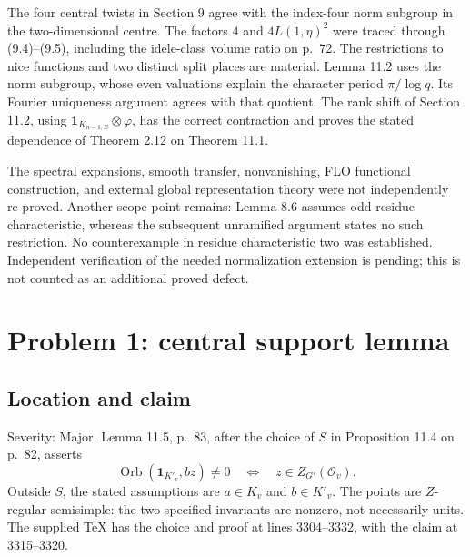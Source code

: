 \documentclass[10pt]{article}
\begin{document}
The four central twists in Section 9 agree with the index-four norm subgroup in the two-dimensional centre. The factors \(4\) and \(4L(1,\eta)^2\) were traced through (9.4)–(9.5), including the idele-class volume ratio on p. 72. The restrictions to nice functions and two distinct split places are material. Lemma 11.2 uses the norm subgroup, whose even valuations explain the character period \(\pi/\log q\). Its Fourier uniqueness argument agrees with that quotient. The rank shift of Section 11.2, using \(\mathbf 1_{K_{n-1,E}}\otimes\varphi\), has the correct contraction and proves the stated dependence of Theorem 2.12 on Theorem 11.1.\par
The spectral expansions, smooth transfer, nonvanishing, FLO functional construction, and external global representation theory were not independently re-proved. Another scope point remains: Lemma 8.6 assumes odd residue characteristic, whereas the subsequent unramified argument states no such restriction. No counterexample in residue characteristic two was established. Independent verification of the needed normalization extension is pending; this is not counted as an additional proved defect.\par
\section*{Problem 1: central support lemma}
\subsection*{Location and claim}
Severity: Major. Lemma 11.5, p. 83, after the choice of \(S\) in Proposition 11.4 on p. 82, asserts \[\operatorname{Orb}(\mathbf 1_{K'_v},bz)\ne0
 \quad\Longleftrightarrow\quad z\in Z_{G'}(\mathcal O_v). \tag{P1}\] Outside \(S\), the stated assumptions are \(a\in K_v\) and \(b\in K'_v\). The points are \(Z\)-regular semisimple: the two specified invariants are nonzero, not necessarily units. The supplied TeX has the choice and proof at lines 3304–3332, with the claim at 3315–3320.\par
\end{document}
